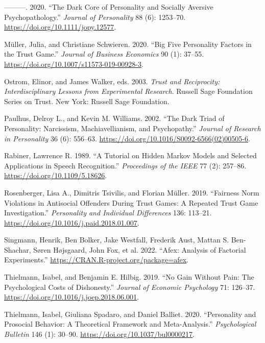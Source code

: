 \documentclass[
]{article}
\newlength{\cslhangindent}
\newenvironment{CSLReferences}[2] %
 {\begin{list}{}{%
  \setlength{\itemindent}{0pt}
  \setlength{\leftmargin}{0pt}
  \setlength{\parsep}{0pt}
  \ifodd #1
   \setlength{\leftmargin}{\cslhangindent}
   \setlength{\itemindent}{-1\cslhangindent}
  \fi
  \setlength{\itemsep}{#2\baselineskip}}}
 {\end{list}}
\begin{document}
\begin{CSLReferences}{1}{0}
---------. 2020. {``The Dark Core of Personality and Socially Aversive Psychopathology.''} \emph{Journal of Personality} 88 (6): 1253--70. \url{https://doi.org/10.1111/jopy.12577}.

Müller, Julia, and Christiane Schwieren. 2020. {``Big Five Personality Factors in the Trust Game.''} \emph{Journal of Business Economics} 90 (1): 37--55. \url{https://doi.org/10.1007/s11573-019-00928-3}.

Ostrom, Elinor, and James Walker, eds. 2003. \emph{Trust and Reciprocity: Interdisciplinary Lessons from Experimental Research}. Russell Sage Foundation Series on Trust. New York: Russell Sage Foundation.

Paulhus, Delroy L., and Kevin M. Williams. 2002. {``The Dark Triad of Personality: Narcissism, Machiavellianism, and Psychopathy.''} \emph{Journal of Research in Personality} 36 (6): 556--63. \url{https://doi.org/10.1016/S0092-6566(02)00505-6}.

Rabiner, Lawrence R. 1989. {``A Tutorial on Hidden Markov Models and Selected Applications in Speech Recognition.''} \emph{Proceedings of the IEEE} 77 (2): 257--86. \url{https://doi.org/10.1109/5.18626}.

Rosenberger, Lisa A., Dimitris Tsivilis, and Florian Müller. 2019. {``Fairness Norm Violations in Antisocial Offenders During Trust Games: {A} Repeated Trust Game Investigation.''} \emph{Personality and Individual Differences} 136: 113--21. \url{https://doi.org/10.1016/j.paid.2018.01.007}.

Singmann, Henrik, Ben Bolker, Jake Westfall, Frederik Aust, Mattan S. Ben-Shachar, Søren Højsgaard, John Fox, et al. 2022. {``Afex: Analysis of Factorial Experiments.''} \url{https://CRAN.R-project.org/package=afex}.

Thielmann, Isabel, and Benjamin E. Hilbig. 2019. {``No Gain Without Pain: {The} Psychological Costs of Dishonesty.''} \emph{Journal of Economic Psychology} 71: 126--37. \url{https://doi.org/10.1016/j.joep.2018.06.001}.

Thielmann, Isabel, Giuliana Spadaro, and Daniel Balliet. 2020. {``Personality and Prosocial Behavior: A Theoretical Framework and Meta-Analysis.''} \emph{Psychological Bulletin} 146 (1): 30--90. \url{https://doi.org/10.1037/bul0000217}.


\end{CSLReferences}
\end{document}
